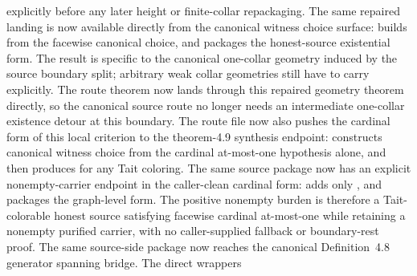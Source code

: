 \documentclass[11pt]{article}
\begin{document}
\begin{itemize}
explicitly before any later height or finite-collar repackaging.
The same repaired landing is now available directly from the canonical witness
choice surface:
builds  from the
facewise canonical choice, and
packages the honest-source existential form.  The result is specific to the
canonical one-collar geometry induced by the source boundary split; arbitrary
weak collar geometries still have to carry
 explicitly.  The route theorem
now lands through this repaired geometry theorem directly, so the canonical
source route no longer needs an intermediate one-collar existence detour at
this boundary.
The route file now
also pushes the cardinal form of this local criterion to the theorem-4.9
synthesis endpoint:
constructs canonical witness choice from the cardinal at-most-one hypothesis
alone, and
then produces  for any Tait coloring.
The same source package now has an explicit nonempty-carrier endpoint in the
caller-clean cardinal form:
adds only
, and
packages the graph-level form.  The positive nonempty burden is therefore a
Tait-colorable honest source satisfying facewise cardinal at-most-one while
retaining a nonempty purified carrier, with no caller-supplied fallback or
boundary-rest proof.
The same source-side package now reaches the canonical Definition~4.8
generator spanning bridge.  The direct wrappers

\end{itemize}
\end{document}
